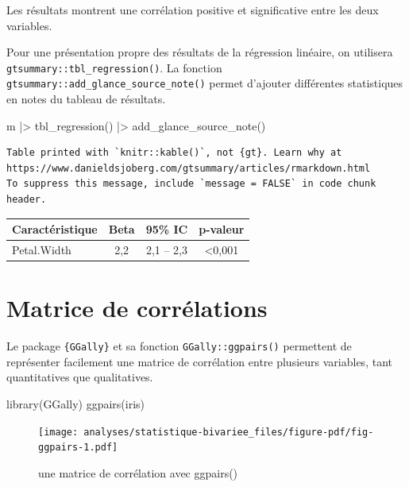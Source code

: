 \documentclass[
  letterpaper,
  DIV=11,
  numbers=noendperiod,
  oneside]{scrreprt}
\newenvironment{Shaded}{\begin{snugshade}}{\end{snugshade}}
\newcommand{\FunctionTok}[1]{\textcolor[rgb]{0.28,0.35,0.67}{#1}}
\newcommand{\NormalTok}[1]{\textcolor[rgb]{0.00,0.23,0.31}{#1}}
\newcommand{\SpecialCharTok}[1]{\textcolor[rgb]{0.37,0.37,0.37}{#1}}
\begin{document}
Les résultats montrent une corrélation positive et significative entre
les deux variables.

Pour une présentation propre des résultats de la régression linéaire, on
utilisera \texttt{gtsummary::tbl\_regression()}. La fonction
\texttt{gtsummary::add\_glance\_source\_note()} permet d'ajouter
différentes statistiques en notes du tableau de résultats.

\begin{Shaded}
\begin{Highlighting}[]
\NormalTok{m }\SpecialCharTok{|\textgreater{}} 
  \FunctionTok{tbl\_regression}\NormalTok{() }\SpecialCharTok{|\textgreater{}} 
  \FunctionTok{add\_glance\_source\_note}\NormalTok{()}
\end{Highlighting}
\end{Shaded}

\begin{verbatim}
Table printed with `knitr::kable()`, not {gt}. Learn why at
https://www.danieldsjoberg.com/gtsummary/articles/rmarkdown.html
To suppress this message, include `message = FALSE` in code chunk header.
\end{verbatim}

\begin{longtable}[]{@{}lccc@{}}
\toprule()
\textbf{Caractéristique} & \textbf{Beta} & \textbf{95\% IC} &
\textbf{p-valeur} \\
\midrule()
\endhead
Petal.Width & 2,2 & 2,1 -- 2,3 & \textless0,001 \\
\bottomrule()
\end{longtable}

\hypertarget{matrice-de-corruxe9lations}{%
\section{Matrice de corrélations}\label{matrice-de-corruxe9lations}}

Le package \texttt{\{GGally\}} et sa fonction \texttt{GGally::ggpairs()}
permettent de représenter facilement une matrice de corrélation entre
plusieurs variables, tant quantitatives que qualitatives.

\begin{Shaded}
\begin{Highlighting}[]
\FunctionTok{library}\NormalTok{(GGally)}
\FunctionTok{ggpairs}\NormalTok{(iris)}
\end{Highlighting}
\end{Shaded}

\begin{figure}[H]

{\centering \texttt{[image: analyses/statistique-bivariee\_files/figure-pdf/fig-ggpairs-1.pdf]}

}

\caption{\label{fig-ggpairs}une matrice de corrélation avec ggpairs()}

\end{figure}
\end{document}
